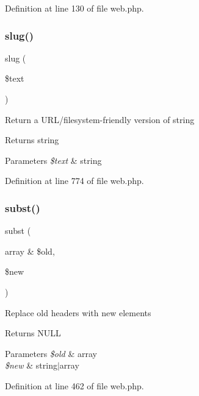 Definition at line 130 of file web.\+php.

\hypertarget{class_web_a286c5e5759ec08bb103644e94de36b6f}{}\label{class_web_a286c5e5759ec08bb103644e94de36b6f} 
\subsubsection{\texorpdfstring{slug()}{slug()}}
{\footnotesize\ttfamily slug (\begin{DoxyParamCaption}\item[{}]{\$text }\end{DoxyParamCaption})}

Return a U\+R\+L/filesystem-\/friendly version of string \begin{DoxyReturn}{Returns}
string 
\end{DoxyReturn}

\begin{DoxyParams}{Parameters}
{\em \$text} & string \\
\hline
\end{DoxyParams}


Definition at line 774 of file web.\+php.

\hypertarget{class_web_acd091c5f2f55c3f0f5e1fce9dee1d76a}{}\label{class_web_acd091c5f2f55c3f0f5e1fce9dee1d76a} 
\subsubsection{\texorpdfstring{subst()}{subst()}}
{\footnotesize\ttfamily subst (\begin{DoxyParamCaption}\item[{array \&}]{\$old,  }\item[{}]{\$new }\end{DoxyParamCaption})}

Replace old headers with new elements \begin{DoxyReturn}{Returns}
N\+U\+LL 
\end{DoxyReturn}

\begin{DoxyParams}{Parameters}
{\em \$old} & array \\
\hline
{\em \$new} & string$\vert$array \\
\hline
\end{DoxyParams}


Definition at line 462 of file web.\+php.

